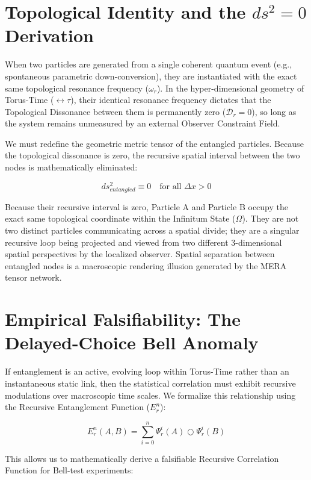 \documentclass[12pt,openany]{book}
\begin{document}
\section{Topological Identity and the $ds^2 = 0$ Derivation}
When two particles are generated from a single coherent quantum event (e.g., spontaneous parametric down-conversion), they are instantiated with the exact same topological resonance frequency ($\omega_r$). In the hyper-dimensional geometry of Torus-Time ($\leftrightarrow\tau$), their identical resonance frequency dictates that the Topological Dissonance between them is permanently zero ($\mathcal{D}_r = 0$), so long as the system remains unmeasured by an external Observer Constraint Field.

We must redefine the geometric metric tensor of the entangled particles. Because the topological dissonance is zero, the recursive spatial interval between the two nodes is mathematically eliminated:

\begin{equation}
ds_{entangled}^2 \equiv 0 \quad \text{for all } \Delta x > 0
\end{equation}

Because their recursive interval is zero, Particle A and Particle B occupy the exact same topological coordinate within the Infinitum State ($\Omega$). They are not two distinct particles communicating across a spatial divide; they are a singular recursive loop being projected and viewed from two different 3-dimensional spatial perspectives by the localized observer. Spatial separation between entangled nodes is a macroscopic rendering illusion generated by the MERA tensor network.

\section{Empirical Falsifiability: The Delayed-Choice Bell Anomaly}
If entanglement is an active, evolving loop within Torus-Time rather than an instantaneous static link, then the statistical correlation must exhibit recursive modulations over macroscopic time scales. We formalize this relationship using the Recursive Entanglement Function ($E_r^n$):

\begin{equation}
E_r^n(A,B) = \sum_{i=0}^n \Psi_r^i(A) \bigcirc \Psi_r^i(B)
\end{equation}

This allows us to mathematically derive a falsifiable Recursive Correlation Function for Bell-test experiments:
\end{document}
